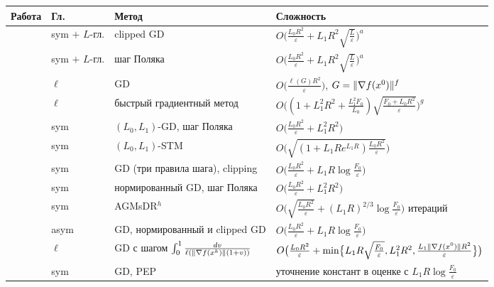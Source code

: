\begin{center}
\footnotesize
{}
\label{tab:lit-convex}
\begin{tabularx}{\linewidth}{@{}P{.2\linewidth}lP{.2\linewidth}Y@{}}
\toprule
Работа & Гл. & Метод & Сложность\\
\midrule
\citet{koloskova2023revisiting} & sym $+$ $L$-гл. & clipped GD & $O\bigl(\frac{L_0R^2}{\varepsilon}+L_1R^2\sqrt{\frac L\varepsilon}\bigr)^{a}$\\
\citet{takezawa2024polyak} & sym $+$ $L$-гл. & шаг Поляка & $O\bigl(\frac{L_0R^2}{\varepsilon}+L_1R^2\sqrt{\frac L\varepsilon}\bigr)^{a}$\\
\citet{li2023generalized} & $\ell$ & GD & $O\bigl(\frac{\ell(G)R^2}{\varepsilon}\bigr)$, $G=\|\nabla f(x^0)\|^{f}$\\
\citet{li2023generalized} & $\ell$ & быстрый градиентный метод & $O\bigl((1+L_1^2R^2+\frac{L_1^2F_0}{L_0})\sqrt{\frac{F_0+L_0R^2}\varepsilon}\bigr)^{g}$\\
\citet{gorbunov2024methods} & sym & $(L_0,L_1)$-GD, шаг Поляка & $O\bigl(\frac{L_0R^2}{\varepsilon}+L_1^2R^2\bigr)$\\
\citet{gorbunov2024methods} & sym & $(L_0,L_1)$-STM & $O\bigl(\sqrt{(1+L_1Re^{L_1R})\frac{L_0R^2}{\varepsilon}}\bigr)$\\
\citet{vankov2025optimizing} & sym & GD (три правила шага), clipping & $O\bigl(\frac{L_0R^2}{\varepsilon}+L_1R\log\frac{F_0}{\varepsilon}\bigr)$\\
\citet{vankov2025optimizing} & sym & нормированный GD, шаг Поляка & $O\bigl(\frac{L_0R^2}{\varepsilon}+L_1^2R^2\bigr)$\\
\citet{vankov2025optimizing} & sym & AGMsDR$^{h}$ & $O\bigl(\sqrt{\frac{L_0R^2}{\varepsilon}}+(L_1R)^{2/3}\log\frac{F_0}{\varepsilon}\bigr)$ итераций\\
\citet{lobanov2025linear} & asym & GD, нормированный и clipped GD & $O\bigl(\frac{L_0R^2}{\varepsilon}+L_1R\log\frac{F_0}{\varepsilon}\bigr)$\\
\citet{tyurin2025unified} & $\ell$ & GD с шагом $\int_0^1\frac{dv}{\ell(\|\nabla f(x^k)\|(1+v))}$ & $O\bigl(\frac{L_0R^2}{\varepsilon}+\min\bigl\{L_1R\sqrt{\frac{F_0}\varepsilon},L_1^2R^2,\frac{L_1\|\nabla f(x^0)\|R^2}{\varepsilon}\bigr\}\bigr)$\\
\citet{krivchenko2026computer} & sym & GD, PEP & уточнение констант в оценке с $L_1R\log\frac{F_0}{\varepsilon}$\\

\end{tabularx}
\end{center}
